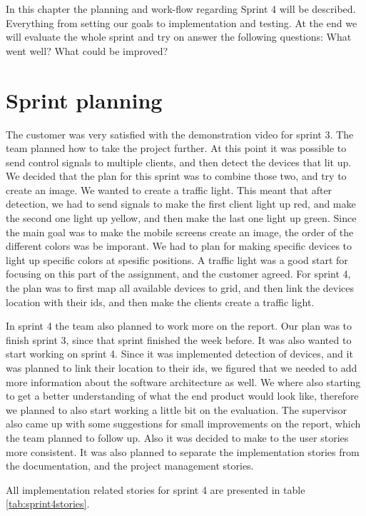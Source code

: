 In this chapter the planning and work-flow regarding Sprint 4 will be described. 
Everything from setting our goals to implementation and testing. At the end we will evaluate the whole sprint and try on answer the following questions: What went well? What could be improved? 
\section{Sprint planning}

The customer was very satisfied with the demonstration video for sprint 3. The team planned how to take the project further. At this point it was possible to send control signals to multiple clients, and then detect the devices that lit up. We decided that the plan for this sprint was to combine those two, and try to create an image. We wanted to create a traffic light. This meant that after detection, we had to send signals to make the first client light up red, and make the second one light up yellow, and then make the last one light up green. Since the main goal was to make the mobile screens create an image, the order of the different colors was be imporant. We had to plan for making specific devices to light up specific colors at spesific positions. A traffic light was a good start for focusing on this part of the assignment, and the customer agreed. For sprint 4, the plan was to first map all available devices to grid, and then link the devices location with their ids, and then make the clients create a traffic light.  


In sprint 4 the team also planned to work more on the report. Our plan was to finish sprint 3, since that sprint finished the week before. It was also wanted to start working on sprint 4. Since it was implemented detection of devices, and it was planned to link their location to their ids, we figured that we needed to add more information about the software architecture as well. We where also starting to get a better understanding of what the end product would look like, therefore we planned to also start working a little bit on the evaluation. The supervisor also came up with some suggestions for small improvements on the report, which the team planned to follow up. Also it was decided to make to the user stories more consistent. It was also planned to separate the implementation stories from the documentation, and the project management stories.


All implementation related stories for sprint 4 are presented in table \ref{tab:sprint4stories}.

